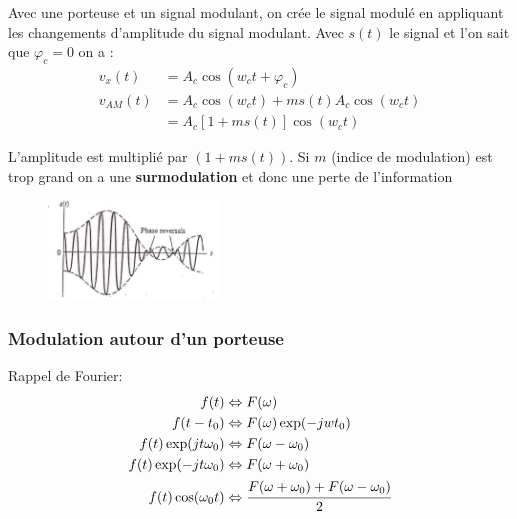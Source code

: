		Avec une porteuse et un signal modulant, on crée le signal modulé en appliquant les changements d'amplitude du signal modulant. Avec $s(t)$ le signal et l'on sait que $\varphi_c = 0$ on a :
		\begin{equation} \label{eq1}
			\begin{split}
		v_x(t) &= A_c \cos(w_ct + \varphi_c) \\
		v_{AM}(t) &= A_c \cos(w_ct) + ms(t) A_c \cos(w_c t) \\
		& = A_c[1+ms(t)]\cos(w_c t)
			\end{split}
		\end{equation}
		
		L'amplitude est multiplié par $(1+ms(t))$. Si $m$ (indice de modulation) est trop grand on a une \textbf{surmodulation} et donc une perte de l'information
		\begin{figure}[htp]
			\centering
			\includegraphics[width=0.4\textwidth]{img/surmodulation.png}
		\end{figure}
		
		\subsubsection{Modulation autour d'un porteuse}
			Rappel de Fourier:
			\begin{equation} \label{eq1}
			\begin{split}
				f(t) &\Leftrightarrow F(\omega)\\
				f(t-t_0) & \Leftrightarrow F(\omega) \exp(-jwt_0)\\
				f(t) \exp(jt\omega_0) &\Leftrightarrow F(\omega - \omega_0)\\
				f(t) \exp(-jt\omega_0) &\Leftrightarrow F(\omega + \omega_0)\\
				f(t) \cos(\omega_0 t) &\Leftrightarrow \cfrac{F(\omega + \omega_0) + F(\omega - \omega_0)}{2}
			\end{split}
		\end{equation}
		
